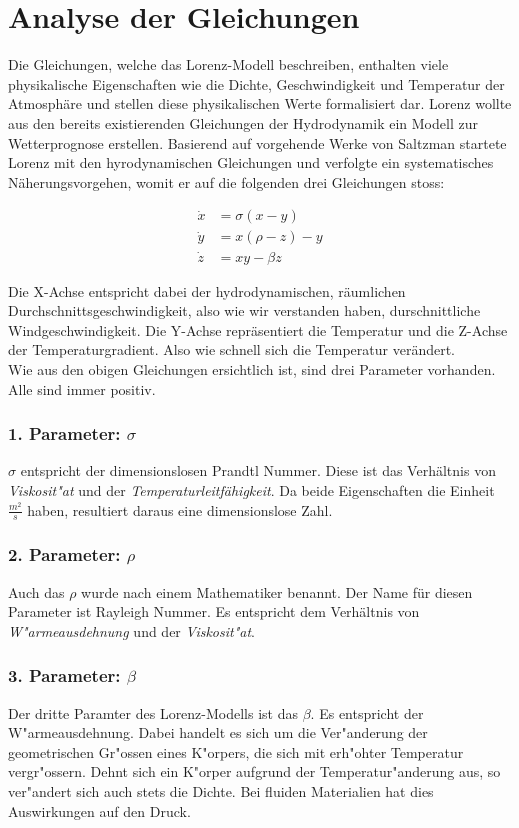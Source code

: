 \documentclass[implementation]{subfiles}
\begin{document}
	\section{Analyse der Gleichungen}
	Die Gleichungen, welche das Lorenz-Modell beschreiben, enthalten viele physikalische Eigenschaften wie die Dichte, Geschwindigkeit und Temperatur der Atmosphäre und stellen diese physikalischen Werte formalisiert dar. Lorenz wollte aus den bereits existierenden Gleichungen der Hydrodynamik ein Modell zur Wetterprognose erstellen. Basierend auf vorgehende Werke von Saltzman startete Lorenz mit den hyrodynamischen Gleichungen und verfolgte ein systematisches Näherungsvorgehen, womit er auf die folgenden drei Gleichungen stoss:
		
		\begin{centerFigure}
			\begin{align}
			\dot{x} &= \sigma(x - y)\\
			\dot{y} &= x(\rho - z) - y\\
			\dot{z} &= xy - \beta z
			\end{align}
		\end{centerFigure}
		
	Die X-Achse entspricht dabei der hydrodynamischen, räumlichen Durchschnittsgeschwindigkeit, also wie wir verstanden haben, durschnittliche Windgeschwindigkeit. 
	Die Y-Achse repräsentiert die Temperatur und die Z-Achse der Temperaturgradient. Also wie schnell sich die Temperatur verändert. \\
	Wie aus den obigen Gleichungen ersichtlich ist, sind drei Parameter vorhanden. Alle sind immer positiv.
	\subsubsection{1. Parameter: $\sigma$}
	$\sigma$ entspricht der dimensionslosen Prandtl Nummer. Diese ist das Verhältnis von \textit{Viskosit"at} und der \textit{Temperaturleitfähigkeit}. Da beide Eigenschaften die Einheit $\frac{m^2}{s}$ haben, resultiert daraus eine dimensionslose Zahl.
	\subsubsection{2. Parameter: $\rho$}
	Auch das $\rho$ wurde nach einem Mathematiker benannt. Der Name für diesen Parameter ist Rayleigh Nummer. Es entspricht dem Verhältnis von \textit{W"armeausdehnung} und der \textit{Viskosit"at}.
	\subsubsection{3. Parameter: $\beta$}
	Der dritte Paramter des Lorenz-Modells ist das $\beta$. Es entspricht der W"armeausdehnung. Dabei handelt es sich um die Ver"anderung der geometrischen Gr"ossen eines K"orpers, die sich mit erh"ohter Temperatur vergr"ossern. Dehnt sich ein K"orper aufgrund der Temperatur"anderung aus, so ver"andert sich auch stets die Dichte. Bei fluiden Materialien hat dies Auswirkungen auf den Druck. 
	
\end{document}
